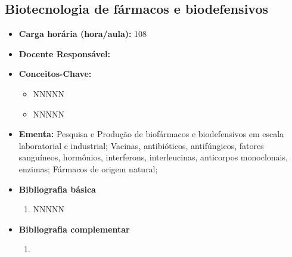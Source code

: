 \documentclass[11pt,fleqn]{book} %
\begin{document}
\subsection{Biotecnologia de fármacos e biodefensivos}\label{disc:biotecFarmacos}
\begin{itemize}
	\item \textbf{Carga horária (hora/aula):} 108
	\item \textbf{Docente Responsável:}
	\item \textbf{Conceitos-Chave:}
	\begin{itemize}
		\item NNNNN
		\item NNNNN
	\end{itemize}
	\item \textbf{Ementa:} 
	Pesquisa e Produção de biofármacos e biodefensivos em escala laboratorial e industrial;
	Vacinas, antibióticos, antifúngicos, fatores sanguíneos, hormônios, interferons, interleucinas,
	anticorpos monoclonais, enzimas; 
	Fármacos de origem natural;
	\item \textbf{Bibliografia básica}
	\begin{enumerate}
		\item NNNNN
	\end{enumerate}
	\item \textbf{Bibliografia complementar}
	\begin{enumerate}
		\item 
	\end{enumerate}	
\end{itemize}


\newpage
\end{document}
